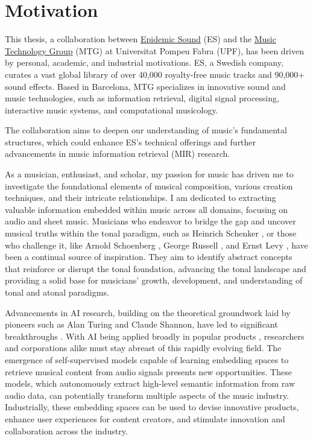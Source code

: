 \section{Motivation}

This thesis, a collaboration between \href{https://www.epidemicsound.com/}{Epidemic Sound} (ES) and the \href{https://www.upf.edu/web/mtg}{Music Technology Group} (MTG) at Universitat Pompeu Fabra (UPF), has been driven by personal, academic, and industrial motivations. ES, a Swedish company, curates a vast global library of over 40,000 royalty-free music tracks and 90,000+ sound effects. Based in Barcelona, MTG specializes in innovative sound and music technologies, such as information retrieval, digital signal processing, interactive music systems, and computational musicology.

The collaboration aims to deepen our understanding of music's fundamental structures, which could enhance ES's technical offerings and further advancements in music information retrieval (MIR) research.

As a musician, enthusiast, and scholar, my passion for music has driven me to investigate the foundational elements of musical composition, various creation techniques, and their intricate relationships. I am dedicated to extracting valuable information embedded within music across all domains, focusing on audio and sheet music. Musicians who endeavor to bridge the gap and uncover musical truths within the tonal paradigm, such as Heinrich Schenker \cite{Komar1959SchenkersStructure}, or those who challenge it, like Arnold Schoenberg \cite{Samson1974SchoenbergsMusic}, George Russell \cite{LydianRussell}, and Ernst Levy \cite{LevyAHarmony}, have been a continual source of inspiration. They aim to identify abstract concepts that reinforce or disrupt the tonal foundation, advancing the tonal landscape and providing a solid base for musicians' growth, development, and understanding of tonal and atonal paradigms.

Advancements in AI research, building on the theoretical groundwork laid by pioneers such as Alan Turing and Claude Shannon, have led to significant breakthroughs \cite{Vaswani2017AttentionNeed}. With AI being applied broadly in popular products \cite{OpenAI2023GPT-4Report}, researchers and corporations alike must stay abreast of this rapidly evolving field. The emergence of self-supervised models capable of learning embedding spaces to retrieve musical content from audio signals presents new opportunities. These models, which autonomously extract high-level semantic information from raw audio data, can potentially transform multiple aspects of the music industry. Industrially, these embedding spaces can be used to devise innovative products, enhance user experiences for content creators, and stimulate innovation and collaboration across the industry.

